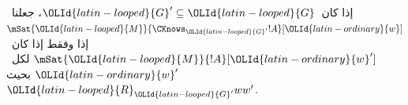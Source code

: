 \documentclass[../../../include/open-logic-section]{subfiles}
\begin{document}
\begin{defn}
إذا كان~${\OLId{latin-looped}{G}}' \subseteq {\OLId{latin-looped}{G}}$، جعلنا~$\mSat{{\OLId{latin-looped}{M}}}{\CKnows_{{\OLId{latin-looped}{G}}'} !A}[{\OLId{latin-ordinary}{w}}]$ إذا
وفقط إذا كان~$\mSat{{\OLId{latin-looped}{M}}}{!A}[{\OLId{latin-ordinary}{w}}']$ لكل~${\OLId{latin-ordinary}{w}}'$ بحيث~${\OLId{latin-looped}{R}}_{{\OLId{latin-looped}{G}}'}ww'$.
\end{defn}
\end{document}
